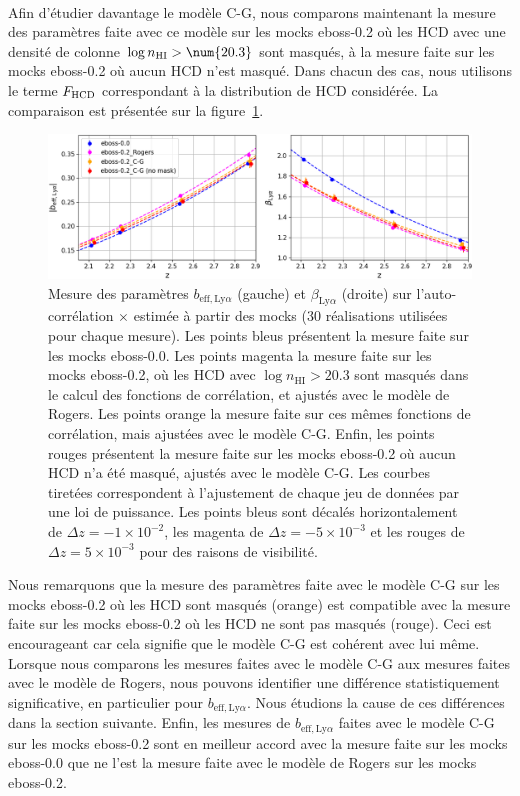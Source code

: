 \paragraph{}
Afin d'étudier davantage le modèle C-G, nous comparons maintenant la mesure des paramètres \lya{} faite avec ce modèle sur les mocks eboss-0.2 où les HCD avec une densité de colonne $\log n_{\textsc{HI}} > \num{20.3}$ sont masqués, à la mesure faite sur les mocks eboss-0.2 où aucun HCD n'est masqué. Dans chacun des cas, nous utilisons le terme $F_{\textsc{HCD}}$ correspondant à la distribution de HCD considérée.
La comparaison est présentée sur la figure~\ref{fig:bias_cg_rogers_comp}.
\begin{figure}
  \centering
  \includegraphics[scale=0.43]{bias_cg_rogers_comp}
  \caption{Mesure des paramètres $b_{\mathrm{eff},\mathrm{Ly}\alpha}$ (gauche) et $\beta_{\mathrm{Ly}\alpha}$ (droite) sur l'auto-corrélation \lya$\times$\lya{} estimée à partir des mocks (30 réalisations utilisées pour chaque mesure). Les points bleus présentent la mesure faite sur les mocks eboss-0.0. Les points magenta la mesure faite sur les mocks eboss-0.2, où les HCD avec $\log n_{\mathrm{HI}} > \num{20.3}$ sont masqués dans le calcul des fonctions de corrélation, et ajustés avec le modèle de Rogers. Les points orange la mesure faite sur ces mêmes fonctions de corrélation, mais ajustées avec le modèle C-G. Enfin, les points rouges présentent la mesure faite sur les mocks eboss-0.2 où aucun HCD n'a été masqué, ajustés avec le modèle C-G.
    Les courbes tiretées correspondent à l'ajustement de chaque jeu de données par une loi de puissance.
Les points bleus sont décalés horizontalement de $\Delta z = -1\times10^{-2}$, les magenta de $\Delta z = -5\times10^{-3}$ et les rouges de $\Delta z = 5\times10^{-3}$ pour des raisons de visibilité.}
  \label{fig:bias_cg_rogers_comp}
\end{figure}
Nous remarquons que la mesure des paramètres \lya{} faite avec le modèle C-G sur les mocks eboss-0.2 où les HCD sont masqués (orange) est compatible avec la mesure faite sur les mocks eboss-0.2 où les HCD ne sont pas masqués (rouge). Ceci est encourageant car cela signifie que le modèle C-G est cohérent avec lui même.
Lorsque nous comparons les mesures faites avec le modèle C-G aux mesures faites avec le modèle de Rogers, nous pouvons identifier une différence statistiquement significative, en particulier pour $b_{\mathrm{eff},\mathrm{Ly}\alpha}$. Nous étudions la cause de ces différences dans la section suivante.
Enfin, les mesures de $b_{\mathrm{eff},\mathrm{Ly}\alpha}$ faites avec le modèle C-G sur les mocks eboss-0.2 sont en meilleur accord avec la mesure faite sur les mocks eboss-0.0 que ne l'est la mesure faite avec le modèle de Rogers sur les mocks eboss-0.2.



